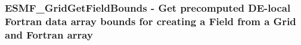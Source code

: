  
\setlength{\oldparskip}{\parskip}
\setlength{\parskip}{1.5ex}
\setlength{\oldparindent}{\parindent}
\setlength{\parindent}{0pt}
\setlength{\oldbaselineskip}{\baselineskip}
\setlength{\baselineskip}{11pt}
 
\def\bv{\begin{verbatim}}
\def\ev{\end{verbatim}}
\def\be{\begin{equation}}
\def\ee{\end{equation}}
\def\bea{\begin{eqnarray}}
\def\eea{\end{eqnarray}}
\def\bi{\begin{itemize}}
\def\ei{\end{itemize}}
\def\bn{\begin{enumerate}}
\def\en{\end{enumerate}}
\def\bd{\begin{description}}
\def\ed{\end{description}}
\def\({\left (}
\def\){\right )}
\def\[{\left [}
\def\]{\right ]}
\def\<{\left  \langle}
\def\>{\right \rangle}
\def\cI{{\cal I}}
\def\diag{\mathop{\rm diag}}
\def\tr{\mathop{\rm tr}}


 
\subsubsection [ESMF\_GridGetFieldBounds] {ESMF\_GridGetFieldBounds - Get precomputed DE-local Fortran data array bounds for creating a Field from a Grid and Fortran array}


